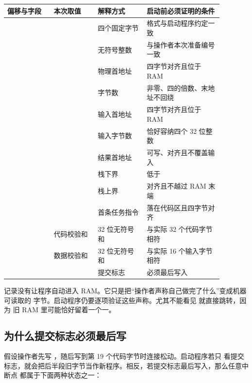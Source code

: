 \begin{longtable}{|L{0.19\linewidth}|L{0.18\linewidth}|L{0.20\linewidth}|L{0.31\linewidth}|}
\hline
{}
偏移与字段 & 本次取值 & 解释方式 & 启动前必须证明的条件 \\ \hline
{} &  & 四个固定字节 & 格式与启动程序约定一致 \\ \hline
{} &  & 无符号整数 & 与操作者本次准备编号一致 \\ \hline
{} &  & 物理首地址 & 四字节对齐且位于 RAM \\ \hline
{} &  & 字节数 & 非零、四的倍数、末地址不回绕 \\ \hline
{} &  & 输入首地址 & 四字节对齐且位于 RAM \\ \hline
{} &  & 输入字节数 & 恰好容纳四个 32 位整数 \\ \hline
{} &  & 结果首地址 & 可写、对齐且不覆盖输入 \\ \hline
{} &  & 栈下界 & 低于  \\ \hline
{} &  & 栈上界 & 对齐且不越过 RAM 末端 \\ \hline
{} &  & 首条任务指令 & 落在代码区且四字节对齐 \\ \hline
{} & 代码校验和 & 32 位无符号和 & 与实际 32 个代码字节相符 \\ \hline
{} & 数据校验和 & 32 位无符号和 & 与实际 16 个输入字节相符 \\ \hline
{} &  & 提交标志 & 必须最后写入 \\ \hline
\end{longtable}

记录没有让程序自动进入 RAM。它只是把“操作者声称自己做完了什么”变成机器可读取的
字节。启动程序仍要逐项验证这些声称。尤其不能看见  就直接跳转，因为
旧 RAM 里可能恰好留着一个一。

\subsection{为什么提交标志必须最后写}

假设操作者先写 ，随后写到第 19 个代码字节时连接松动。启动程序若只
看提交标志，就会把后半段旧字节当作新程序。相反，若提交标志最后写入，那么任意中断点
都属于下面两种状态之一：

